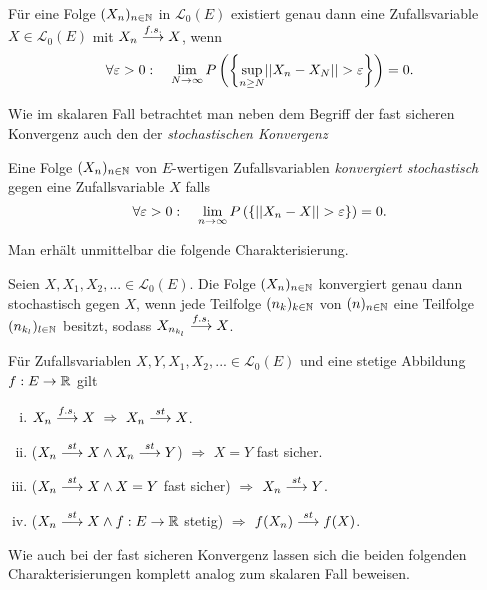 \begin{theorem}
    Für eine Folge $(X_n)_{n \in \mathbb{N}}$ in $\mathcal{L}_0(E)$ existiert genau dann eine Zufallsvariable $X \in \mathcal{L}_0(E)$ mit $X_n \overset{f.s.}{\longrightarrow} X$, wenn
    $$
        \forall \varepsilon > 0 : \quad \lim_{N \to \infty}P\left(\left\{ \sup_{n\geq N}\lvert\lvert X_n - X_N \rvert\rvert > \varepsilon \right\}\right) = 0. 
    $$
\end{theorem}

Wie im skalaren Fall betrachtet man neben dem Begriff der fast sicheren Konvergenz auch den der \textit{stochastischen Konvergenz}

\begin{mydef}
    Eine Folge $(X_n)_{n \in \mathbb{N}}$ von $E$-wertigen Zufallsvariablen \textit{konvergiert stochastisch} gegen eine Zufallsvariable $X$ falls
    $$
        \forall \varepsilon > 0: \quad \lim_{n \to \infty}P\left(\left\{ \lvert\lvert X_n - X  \rvert\rvert > \varepsilon \right\}\right) = 0. 
    $$      
\end{mydef}

Man erhält unmittelbar die folgende Charakterisierung. 

\begin{theorem}[Teilfolgenkriterium]
    Seien $X,X_1,X_2,... \in \mathcal{L}_0(E)$. Die Folge $(X_n)_{n \in \mathbb{N}}$ konvergiert genau dann stochastisch gegen $X$, 
    wenn jede Teilfolge $(n_k)_{k \in \mathbb{N}}$ von $(n)_{n \in \mathbb{N}}$ eine Teilfolge $(n_{k_l})_{l \in \mathbb{N}}$ besitzt, sodass $X_{n_{k_l}} \overset{f.s.}{\longrightarrow} X$.  
\end{theorem}

\begin{corollary}
    Für Zufallsvariablen $X,Y, X_1, X_2,... \in \mathcal{L}_0(E)$ und eine stetige Abbildung $f:E \to \mathbb{R}$ gilt
    \begin{enumerate}[(i)]
        \item $X_n \overset{f.s.}{\longrightarrow} X \ \Rightarrow \ X_n \overset{st}{\longrightarrow} X$. 
        \item ($X_n \overset{st}{\longrightarrow} X \land X_n \overset{st}{\longrightarrow} Y$) $\Rightarrow$ $ X = Y$ fast sicher. 
        \item ($X_n \overset{st}{\longrightarrow} X \land X = Y$ fast sicher) $\Rightarrow$ $X_n \overset{st}{\longrightarrow} Y$. 
        \item ($X_n \overset{st}{\longrightarrow} X \land f:E \to \mathbb{R}$ stetig) $\Rightarrow$ $f(X_n) \overset{st}{\longrightarrow} f(X)$. 
    \end{enumerate}
\end{corollary}

Wie auch bei der fast sicheren Konvergenz lassen sich die beiden folgenden Charakterisierungen komplett analog zum skalaren Fall beweisen. 

